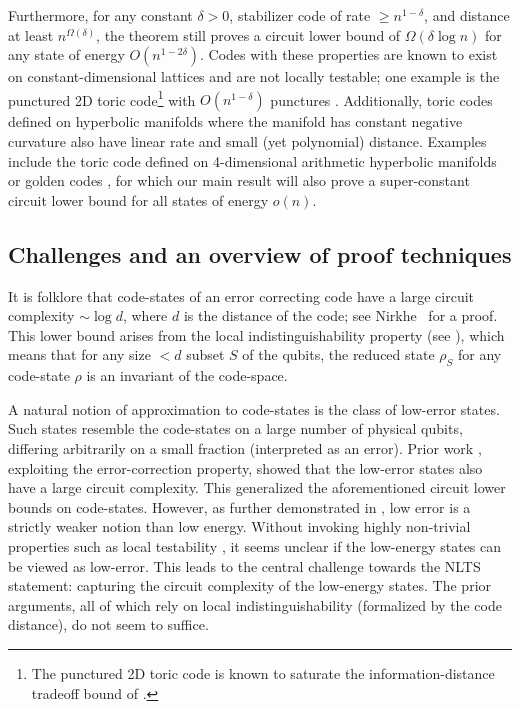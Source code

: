 \documentclass{toc}
\begin{document}
%
%
%
%
%
%
%
%
%
%
Furthermore, for any constant $\delta > 0$,
stabilizer code of rate $\ge n^{1-\delta}$,  %
and distance at least $n^{\Omega(\delta)}$, the theorem still proves a circuit lower bound of $\Omega(\delta \log n)$ for any state of energy $O(n^{1-2\delta})$. Codes with these properties are known to exist on constant-dimensional lattices and are not
%
locally testable;    %
one example is the punctured 2D toric code\footnote{The punctured 2D toric code is known to saturate the information-distance tradeoff bound of \cite{PhysRevLett.104.050503}.} with $O(n^{1-\delta})$ punctures \cite{PhysRevLett.104.050503,PhysRevA.86.032324}. Additionally, toric codes defined on hyperbolic manifolds where the manifold has constant negative curvature also have linear rate and small (yet polynomial) distance. Examples include the toric code defined on  4-dimensional arithmetic hyperbolic manifolds \cite{doi:10.1063/1.4891487} or golden codes \cite{10.5555/3370251.3370252}, for which our main result will also prove a super-constant circuit lower bound for all states of energy $o(n)$. 

\subsection{Challenges and an overview of proof techniques}


%
%
It is folklore that code-states of an error correcting code have a large circuit complexity $\sim\log d$, where $d$ is the distance of the code; see Nirkhe~\cite{Nirkhe:EECS-2022-236} for a proof. This lower bound arises from the local indistinguishability property (see ), which means that for any size $< d$ subset $S$ of the qubits, the
%
reduced state $\rho_S$ %
for any code-state $\rho$ is an invariant of the code-space.

A natural notion of approximation to code-states is the class of low-error states. Such states resemble the code-states on a large number of physical qubits, differing arbitrarily on a small fraction (interpreted as an error). Prior %
%
work  %
\cite{8104078, nirkhe_et_al:LIPIcs:2018:9095}, exploiting the error-correction property, showed that the low-error states also have a large circuit complexity. This generalized the aforementioned circuit lower bounds on code-states. However, as further demonstrated in \cite{nirkhe_et_al:LIPIcs:2018:9095},
%
low error  %
is a strictly weaker notion than
%
low energy.  %
Without invoking highly non-trivial properties such as local testability \cite{8104078}, it seems unclear if the low-energy states can be viewed as low-error.  %
%
This leads to the central challenge towards the NLTS statement:
capturing  %
%
%
the circuit complexity of the low-energy states.
The prior arguments, all of which rely on local indistinguishability
%
%
(formalized by the code distance),  %
%
do not seem to suffice.  
\end{document}
